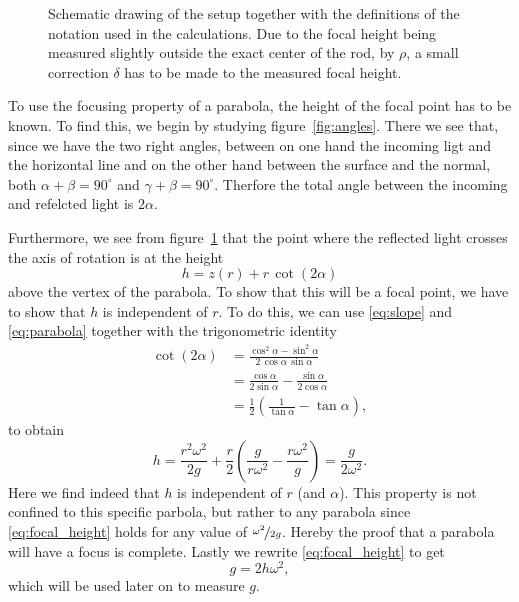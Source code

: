 \documentclass[12pt, a4paper, twocolumn]{article}
\begin{document}
\begin{figure}
\centering
\resizebox{9cm}{!}{}
\caption{
Schematic drawing of the setup together with the definitions of the notation used in the calculations. Due to the focal height being measured slightly outside the exact center of the rod, by $\rho$, a small correction $\delta$ has to be made to the measured focal height.} 
\label{fig:rot_bowl} 
\end{figure}

To use the focusing property of a parabola, the height of the focal point has to be known. To find this, we begin by studying figure~\ref{fig:angles}. There we see that, since we have the two right angles, between on one hand the incoming ligt and the horizontal line and on the other hand between the surface and the normal, both 
$\alpha+\beta = 90^\circ$ and $\gamma+\beta = 90^\circ$. 
Therfore the total angle between the incoming and refelcted light is $2\alpha$. 

Furthermore, we see from figure~\ref{fig:rot_bowl} that the point where the reflected light crosses the axis of rotation is at the height 
\begin{equation}
h= z(r) + r\,\cot(2\alpha)
\end{equation}
above the vertex of the parabola.
To show that this will be a focal point, we have to show that $h$ is independent of $r$. To do this, we can use \eqref{eq:slope} and \eqref{eq:parabola} together with the trigonometric identity
\begin{equation}
\begin{aligned}
\cot(2\alpha)
&=\frac{\cos^2\alpha-\sin^2\alpha}{2\,\cos\alpha\,\sin\alpha}\\
&=\frac{\cos\alpha}{2\sin\alpha}-\frac{\sin\alpha}{2\cos\alpha}\\
&=\frac{1}{2}\left(\frac{1}{\tan\alpha} -\tan\alpha \right),
\end{aligned}
\end{equation}
to obtain
\begin{equation}\label{eq:focal_height}
h=\frac{r^2\omega^2}{2g} 
   + \frac{r}{2}\left(\frac{g}{r\omega^2} -\frac{r\omega^2}{g} \right)
=\frac{g}{2\omega^2}.
\end{equation}
Here we find indeed that $h$ is independent of $r$ (and $\alpha$). This property is not confined to this specific parbola, but rather to any parabola since \eqref{eq:focal_height} holds for any value of $\nicefrac{\omega^2}{2g}$. Hereby the proof that a parabola will have a focus is complete. 
Lastly we rewrite \eqref{eq:focal_height} to get
\begin{equation}
g=2h\omega^2,
\end{equation}
which will be used later on to measure $g$. 
\end{document}

